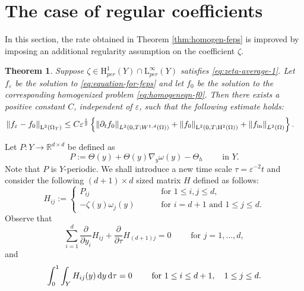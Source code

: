\documentclass[preprint, 12pt]{amsart}
\numberwithin{equation}{section}
\newtheorem{theorem}{Theorem}[section]
\numberwithin{equation}{section}
\newcommand\RR{\mathbb{R}}
\newcommand{\eps}{\varepsilon}
\begin{document}
\section{The case of regular coefficients}\label{sec:3}
In this section, the rate obtained in Theorem \ref{thm:homogen-feps} is improved by imposing an additional regularity assumption on the coefficient $\zeta$.
\begin{theorem}\label{thm:homogen-feps better}
Suppose $\zeta \in \mathrm H_{per}^1(Y) \cap \mathrm L_{per}^{\infty}(Y)$ satisfies \eqref{eq:zeta-average-1}.
Let $f_{\eps}$ be the solution to \eqref{eq:equation-for-feps} and let $f_0$ be the solution to the corresponding homogenized problem \eqref{eq:homogeneqn-f0}. Then there exists a positive constant $C$, independent of $\varepsilon$, such that the following estimate holds:
\begin{equation}\label{eq:L2-estimate better}
\begin{aligned}
\left\Vert f_\eps - f_0 \right\Vert_{\mathrm L^2(\Omega_T)} 
&  \le C \eps^{\frac12} \left\{ \left\Vert \partial_tf_0\right\Vert_{L^2(0,T;W^{1,d}(\Omega))} + \left\Vert f_0\right\Vert_{\mathrm L^2(0,T;\mathrm H^2(\Omega))} + \left\Vert f_{{\rm{in}}}\right\Vert_{L^2(\Omega)} \right\}.
\end{aligned}
\end{equation}
\end{theorem}
Let $P:Y\to\RR^{d\times d}$ be defined as
\begin{equation}\label{eq:matrix-P}
P := \Theta(y) + \Theta(y)\nabla_y\omega(y) - \Theta_h \qquad \mbox{ in }Y.
\end{equation}
Note that $P$ is $Y$-periodic. We shall introduce a new time scale $\tau=\eps^{-2}t$ and consider the following $(d+1)\times d$ sized matrix $H$ defined as follows:
\begin{equation}
H_{ij} := 
\left\{
\begin{aligned}
P_{ij} & \qquad \mbox{ for }1\le i,j\le d,
\\
-\zeta(y)\omega_j(y) & \qquad \mbox{ for }i=d+1 \mbox{ and }1\le j\le d.
\end{aligned}
\right.
\end{equation}
Observe that 
\begin{equation*}
\sum_{i=1}^d \frac{\partial}{\partial y_i}H_{ij} + \frac{\partial}{\partial\tau}H_{(d+1)j} = 0 \qquad \mbox{ for }j=1,\dots,d,
\end{equation*}
and
\begin{equation*}
\int_0^1 \int_Y H_{ij}(y) \, {\rm d}y \, {\rm d}\tau = 0 \qquad \mbox{ for }1\le i\le d+1,\quad 1\le j\le d. 
\end{equation*}
\end{document}

